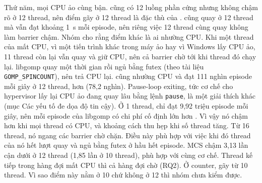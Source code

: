 Thứ năm, mọi CPU ảo cùng bận.  cũng có 12 luồng phần cứng nhưng  không chậm
rõ ở 12 thread, nên điểm gãy ở 12 thread là đặc thù của .  cũng quay ở
12 thread mà vẫn đạt khoảng 1~\textmu s mỗi episode, nên riêng việc 12 thread cùng quay không làm barrier
chậm. Nhóm cho rằng điểm khác là ai nhường CPU. Khi một thread của  mất CPU, vì một tiến trình
khác trong máy ảo hay vì Windows lấy CPU ảo, 11 thread còn lại vẫn quay và giữ CPU, nên cả barrier chờ tới
khi thread đó chạy lại. libgomp quay một thời gian rồi ngủ bằng futex (theo tài liệu
\texttt{GOMP\_SPINCOUNT}), nên trả CPU lại.  cũng nhường CPU và đạt 111 nghìn episode
mỗi giây ở 12 thread, hơn  (78,2 nghìn). Pause-loop exiting, tức cơ chế cho hypervisor lấy lại
CPU ảo đang quay lâu bằng lệnh \texttt{pause}, là một giải thích khác (mục Các yếu tố đe dọa độ tin cậy).
Ở 1 thread,  chỉ đạt 9,92 triệu episode mỗi giây, nên mỗi episode của libgomp có chi
phí cố định lớn hơn . Vì vậy nó chậm hơn  khi mọi thread có CPU, và khoảng cách thu
hẹp khi số thread tăng. Từ 16 thread, nó ngang các barrier chờ chặn. Điều này phù hợp với việc khi đó
thread của nó hết lượt quay và ngủ bằng futex ở hầu hết episode. MCS chậm 3,13 lần cận dưới ở 12 thread
(1,85 lần ở 10 thread), phù hợp với cùng cơ chế. Thread kế tiếp trong hàng đợi mất CPU thì cả hàng đợi chờ
(RQ2). Ở counter,  gãy từ 10 thread. Vì sao điểm này nằm ở 10 chứ không ở 12 thì nhóm
chưa kiểm được.

